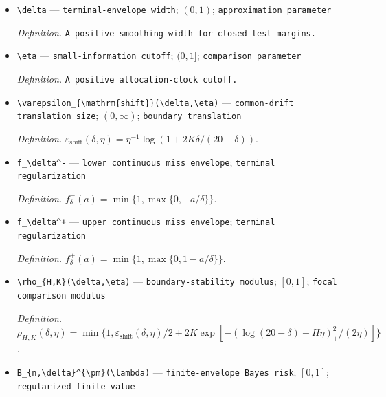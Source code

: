 \documentclass{article}
\begin{document}
\begin{itemize}
  \item \texttt{\textbackslash{}\allowbreak{}delta} --- \texttt{terminal-\allowbreak{}envelope width}; \((0,1)\); \texttt{approximation parameter}
  \par\smallskip\noindent\emph{Definition.} \texttt{A positive smoothing width for closed-\allowbreak{}test margins.}
  \item \texttt{\textbackslash{}\allowbreak{}eta} --- \texttt{small-\allowbreak{}information cutoff}; \((0,1]\); \texttt{comparison parameter}
  \par\smallskip\noindent\emph{Definition.} \texttt{A positive allocation-\allowbreak{}clock cutoff.}
  \item \texttt{\textbackslash{}\allowbreak{}varepsilon\_\allowbreak{}\{\textbackslash{}\allowbreak{}mathrm\{shift\}\allowbreak{}\}\allowbreak{}(\textbackslash{}\allowbreak{}delta,\allowbreak{}\textbackslash{}\allowbreak{}eta)} --- \texttt{common-\allowbreak{}drift translation size}; \((0,\infty)\); \texttt{boundary translation}
  \par\smallskip\noindent\emph{Definition.} \(\varepsilon_{\mathrm{shift}}(\delta,\eta)=\eta^{-1}\log(1+2K\delta/(20-\delta))\).
  \item \texttt{f\_\allowbreak{}\textbackslash{}\allowbreak{}delta\textasciicircum{}-\allowbreak{}} --- \texttt{lower continuous miss envelope}; \texttt{terminal regularization}
  \par\smallskip\noindent\emph{Definition.} \(f_\delta^-(a)=\min\{1,\max\{0,-a/\delta\}\}\).
  \item \texttt{f\_\allowbreak{}\textbackslash{}\allowbreak{}delta\textasciicircum{}+\allowbreak{}} --- \texttt{upper continuous miss envelope}; \texttt{terminal regularization}
  \par\smallskip\noindent\emph{Definition.} \(f_\delta^+(a)=\min\{1,\max\{0,1-a/\delta\}\}\).
  \item \texttt{\textbackslash{}\allowbreak{}rho\_\allowbreak{}\{H,\allowbreak{}K\}\allowbreak{}(\textbackslash{}\allowbreak{}delta,\allowbreak{}\textbackslash{}\allowbreak{}eta)} --- \texttt{boundary-\allowbreak{}stability modulus}; \([0,1]\); \texttt{focal comparison modulus}
  \par\smallskip\noindent\emph{Definition.} \(\rho_{H,K}(\delta,\eta)=\min\{1,\varepsilon_{\mathrm{shift}}(\delta,\eta)/2+2K\exp[-(\log(20-\delta)-H\eta)_+^2/(2\eta)]\}\).
  \item \texttt{B\_\allowbreak{}\{n,\allowbreak{}\textbackslash{}\allowbreak{}delta\}\allowbreak{}\textasciicircum{}\{\textbackslash{}\allowbreak{}pm\}\allowbreak{}(\textbackslash{}\allowbreak{}lambda)} --- \texttt{finite-\allowbreak{}envelope Bayes risk}; \([0,1]\); \texttt{regularized finite value}

\end{itemize}
\end{document}
